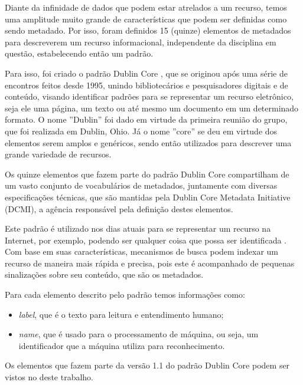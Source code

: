 \begin{textnew}

Diante da infinidade de dados que podem estar atrelados a um recurso, temos uma amplitude muito grande de características que podem ser definidas como sendo metadado. Por isso, foram definidos 15 (quinze) elementos de metadados para descreverem um recurso informacional, independente da disciplina em questão, estabelecendo então um padrão. 

Para isso, foi criado o padrão Dublin Core \cite{dublin-core}, que se originou após uma série de encontros feitos desde 1995, unindo bibliotecários e pesquisadores digitais e de conteúdo, visando identificar padrões para se representar um recurso eletrônico, seja ele uma página, um texto ou até mesmo um documento em um determinado formato. O nome ''Dublin'' foi dado em virtude da primeira reunião do grupo, que foi realizada em Dublin, Ohio. Já o nome ''core'' se deu em virtude dos elementos serem amplos e genéricos, sendo então utilizados para descrever uma grande variedade de recursos.

Os quinze elementos que fazem parte do padrão Dublin Core compartilham de um vasto conjunto de vocabulários de metadados, juntamente com diversas especificações técnicas, que são mantidas pela Dublin Core Metadata Initiative (DCMI), a agência responsável pela definição destes elementos.

Este padrão é utilizado nos dias atuais para se representar um recurso na Internet, por exemplo, podendo ser qualquer coisa que possa ser identificada \cite{dublin-core-1-1}. Com base em suas características, mecanismos de busca podem indexar um recurso de maneira mais rápida e precisa, pois este é acompanhado de pequenas sinalizações sobre seu conteúdo, que são os metadados. 

Para cada elemento descrito pelo padrão temos informações como: 

\begin{itemize}
    \item \textit{label}, que é o texto para leitura e entendimento humano;
    \item \textit{name}, que é usado para o processamento de máquina, ou seja, um identificador que a máquina utiliza para reconhecimento.
\end{itemize}

Os elementos que fazem parte da versão 1.1 do padrão Dublin Core \cite{dublin-core-1-1} podem ser vistos no  deste trabalho.


\end{textnew}
